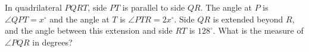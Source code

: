 In quadrilateral $PQRT$, side $PT$ is parallel to side $QR$. The angle at $P$ is $\angle QPT=x^\circ$ and the angle at $T$ is $\angle PTR=2x^\circ$. Side $QR$ is extended beyond $R$, and the angle between this extension and side $RT$ is $128^\circ$. What is the measure of $\angle PQR$ in degrees?
